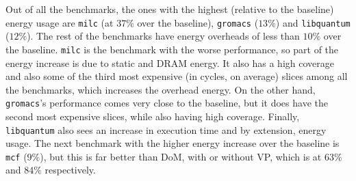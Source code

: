 Out of all the benchmarks, the ones with the highest (relative to the baseline) energy usage are \texttt{milc} (at $37\%$ over the baseline), \texttt{gromacs} ($13\%$) and \texttt{libquantum} ($12\%$). The rest of the benchmarks have energy overheads of less than $10\%$ over the baseline. \texttt{milc} is the benchmark with the worse performance, so part of the energy increase is due to static and DRAM energy. It also has a high \recomp{} coverage and also some of the third most expensive (in cycles, on average) slices among all the benchmarks, which increases the \recomp{} overhead energy. On the other hand, \texttt{gromacs}'s performance comes very close to the baseline, but it does have the second most expensive slices, while also having high coverage. Finally, \texttt{libquantum} also sees an increase in execution time and by extension, energy usage. The next benchmark with the higher energy increase over the baseline is \texttt{mcf} ($9\%$), but this is far better than DoM, with or without VP, which is at $63\%$ and $84\%$ respectively.


